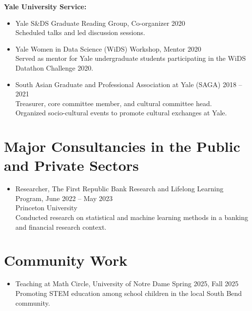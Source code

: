 \documentclass[letterpaper,oneside]{article}
\begin{document}
\noindent\textbf{Yale University Service:}
\begin{itemize}[leftmargin=0pt, label={}]
  \item Yale S\&DS Graduate Reading Group, Co-organizer \hfill 2020\\
  Scheduled talks and led discussion sessions.

  \item Yale Women in Data Science (WiDS) Workshop, Mentor \hfill 2020\\
  Served as mentor for Yale undergraduate students participating in the WiDS Datathon Challenge 2020.

  \item South Asian Graduate and Professional Association at Yale (SAGA) \hfill 2018 -- 2021\\
  Treasurer, core committee member, and cultural committee head.\\
  Organized socio-cultural events to promote cultural exchanges at Yale.
\end{itemize}

\section*{Major Consultancies in the Public and Private Sectors}

\begin{itemize}[leftmargin=0pt, label={}]
  \item Researcher, The First Republic Bank Research and Lifelong Learning Program,  \hfill June 2022 -- May 2023\\ Princeton University\\
  Conducted research on statistical and machine learning methods in a banking and financial research context.
\end{itemize}

\section*{Community Work}

\begin{itemize}[leftmargin=0pt, label={}]
  \item Teaching at Math Circle, University of Notre Dame \hfill Spring 2025, Fall 2025\\
  Promoting STEM education among school children in the local South Bend community.
\end{itemize}

%
\end{document}
